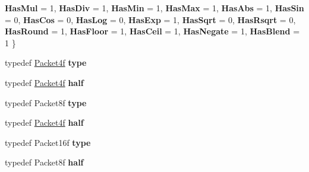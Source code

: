 \begin{DoxyCompactItemize}
{\bfseries Has\+Mul} = 1, 
{\bfseries Has\+Div} = 1, 
\newline
{\bfseries Has\+Min} = 1, 
{\bfseries Has\+Max} = 1, 
{\bfseries Has\+Abs} = 1, 
{\bfseries Has\+Sin} = 0, 
\newline
{\bfseries Has\+Cos} = 0, 
{\bfseries Has\+Log} = 0, 
{\bfseries Has\+Exp} = 1, 
{\bfseries Has\+Sqrt} = 0, 
\newline
{\bfseries Has\+Rsqrt} = 0, 
{\bfseries Has\+Round} = 1, 
{\bfseries Has\+Floor} = 1, 
{\bfseries Has\+Ceil} = 1, 
\newline
{\bfseries Has\+Negate} = 1, 
{\bfseries Has\+Blend} = 1
 \}
\item 
\mbox{\label{struct_eigen_1_1internal_1_1packet__traits_3_01float_01_4_a753e39039ed22b2dde1684c1f8c62985}} 
typedef \hyperlink{struct_eigen_1_1internal_1_1_packet4f}{Packet4f} {\bfseries type}
\item 
\mbox{\label{struct_eigen_1_1internal_1_1packet__traits_3_01float_01_4_ae218bb63db50937a710084a1ed9747c0}} 
typedef \hyperlink{struct_eigen_1_1internal_1_1_packet4f}{Packet4f} {\bfseries half}
\item 
\mbox{\label{struct_eigen_1_1internal_1_1packet__traits_3_01float_01_4_a27392d36d557f994efe8d88df4866656}} 
typedef Packet8f {\bfseries type}
\item 
\mbox{\label{struct_eigen_1_1internal_1_1packet__traits_3_01float_01_4_ae218bb63db50937a710084a1ed9747c0}} 
typedef \hyperlink{struct_eigen_1_1internal_1_1_packet4f}{Packet4f} {\bfseries half}
\item 
\mbox{\label{struct_eigen_1_1internal_1_1packet__traits_3_01float_01_4_ab948cae83ab260558556a8941e985b6b}} 
typedef Packet16f {\bfseries type}
\item 
\mbox{\label{struct_eigen_1_1internal_1_1packet__traits_3_01float_01_4_a1ea1055ec4df15373a78c6827648a4d4}} 
typedef Packet8f {\bfseries half}
\item 

\end{DoxyCompactItemize}
